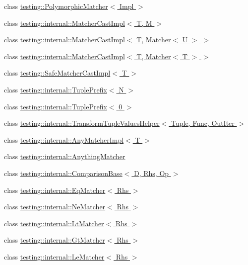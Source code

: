 \begin{DoxyCompactItemize}
\item 
class \hyperlink{classtesting_1_1PolymorphicMatcher}{testing\+::\+Polymorphic\+Matcher$<$ Impl $>$}
\item 
class \hyperlink{classtesting_1_1internal_1_1MatcherCastImpl}{testing\+::internal\+::\+Matcher\+Cast\+Impl$<$ T, M $>$}
\item 
class \hyperlink{classtesting_1_1internal_1_1MatcherCastImpl_3_01T_00_01Matcher_3_01U_01_4_01_4}{testing\+::internal\+::\+Matcher\+Cast\+Impl$<$ T, Matcher$<$ U $>$ $>$}
\item 
class \hyperlink{classtesting_1_1internal_1_1MatcherCastImpl_3_01T_00_01Matcher_3_01T_01_4_01_4}{testing\+::internal\+::\+Matcher\+Cast\+Impl$<$ T, Matcher$<$ T $>$ $>$}
\item 
class \hyperlink{classtesting_1_1SafeMatcherCastImpl}{testing\+::\+Safe\+Matcher\+Cast\+Impl$<$ T $>$}
\item 
class \hyperlink{classtesting_1_1internal_1_1TuplePrefix}{testing\+::internal\+::\+Tuple\+Prefix$<$ N $>$}
\item 
class \hyperlink{classtesting_1_1internal_1_1TuplePrefix_3_010_01_4}{testing\+::internal\+::\+Tuple\+Prefix$<$ 0 $>$}
\item 
class \hyperlink{classtesting_1_1internal_1_1TransformTupleValuesHelper}{testing\+::internal\+::\+Transform\+Tuple\+Values\+Helper$<$ Tuple, Func, Out\+Iter $>$}
\item 
class \hyperlink{classtesting_1_1internal_1_1AnyMatcherImpl}{testing\+::internal\+::\+Any\+Matcher\+Impl$<$ T $>$}
\item 
class \hyperlink{classtesting_1_1internal_1_1AnythingMatcher}{testing\+::internal\+::\+Anything\+Matcher}
\item 
class \hyperlink{classtesting_1_1internal_1_1ComparisonBase}{testing\+::internal\+::\+Comparison\+Base$<$ D, Rhs, Op $>$}
\item 
class \hyperlink{classtesting_1_1internal_1_1EqMatcher}{testing\+::internal\+::\+Eq\+Matcher$<$ Rhs $>$}
\item 
class \hyperlink{classtesting_1_1internal_1_1NeMatcher}{testing\+::internal\+::\+Ne\+Matcher$<$ Rhs $>$}
\item 
class \hyperlink{classtesting_1_1internal_1_1LtMatcher}{testing\+::internal\+::\+Lt\+Matcher$<$ Rhs $>$}
\item 
class \hyperlink{classtesting_1_1internal_1_1GtMatcher}{testing\+::internal\+::\+Gt\+Matcher$<$ Rhs $>$}
\item 
class \hyperlink{classtesting_1_1internal_1_1LeMatcher}{testing\+::internal\+::\+Le\+Matcher$<$ Rhs $>$}

\end{DoxyCompactItemize}
